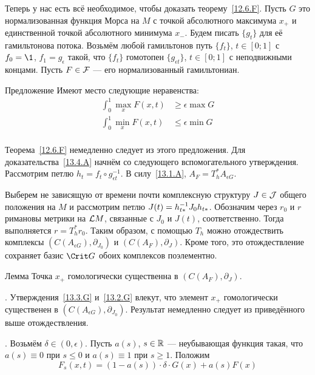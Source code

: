 Теперь у нас есть всё необходимое, чтобы доказать теорему~\ref{12.6.F}.
Пусть $G$ это нормализованная функция Морса на $M$ с
точкой абсолютного максимума $x_{+}$ и единственной точкой абсолютного
минимума $x_{-}$. 
Будем писать $\{g_{t}\}$ для её гамильтонова потока.
Возьмём любой гамильтонов путь $\{f_{t}\}$, $t\in[0;1]$ с $f_{0}=\1$,
$f_{1}=g_{\epsilon}$ такой, что $\{f_{t}\}$ гомотопен $\{g_{\epsilon
t}\}$, $t\in[0;1]$ с неподвижными концами.
Пусть $F\in\mathcal{F}$ --- его нормализованный гамильтониан.
\begin{thm}{Предложение}\label{13.4.A}
  Имеют место следующие неравенства:
  \begin{align*}
    \int_{0}^{1}\max_{x}F(x,t) &\ge \epsilon\max G\\
    \int_{0}^{1}\min_{x}F(x,t) &\le \epsilon\min G\\
  \end{align*}
\end{thm}
Теорема~\ref{12.6.F} немедленно следует из этого предложения.
Для доказательства~\ref{13.4.A} начнём со следующего вспомогательного утверждения.
Рассмотрим петлю $h_{t} = f_{t} \circ g_{\epsilon t}^{-1}$.
В силу~\ref{13.1.A}, $A_{F} = T_{h}^{*}A_{\epsilon G}$.

Выберем не зависящую от времени почти комплексную структуру
$J\in\mathcal{J}$ общего положения на $M$ и рассмотрим петлю $J(t) \z= h_{t*}^{-1}
J_{0}h_{t*}$. 
Обозначим через $r_{0}$ и $r$ римановы метрики на $\mathcal{L} M$, связанные с $J_{0}$ и $J(t)$, соответственно. 
Тогда выполняется $r = T_{h}^{*}r_{0}$.
Таким образом, с помощью $T_{h}$ можно отождествить комплексы
$(C(A_{\epsilon G}), \partial_{J_{0}})$ и $(C(A_{F}), \partial_{J})$.
Кроме того, это отождествление сохраняет базис $\Crit G$ обоих
комплексов поэлементно.

\begin{thm}{Лемма}\label{13.4.B}
  Точка $x_{+}$ гомологически существенна в $(C(A_{F}), \partial_{J})$.  
\end{thm}

.
Утверждения~\ref{13.3.G} и~\ref{13.2.G} влекут, что
элемент $x_{+}$ гомологически существенен в $(C(A_{\epsilon G}), \partial_{J_{0}})$. 
Результат немедленно следует из приведённого выше отождествления.
\qeds

.
Возьмём $\delta\in(0,\epsilon)$.
Пусть $a(s)$, $s\in\mathbb{R}$ --- неубывающая функция такая, что
$a(s)\equiv0$ при $s\le0$ и $a(s)\equiv1$ при $s\ge1$.
Положим
\[
F_{s}(x, t) = (1 - a(s))\cdot\delta\cdot G(x) + a(s)F(x)
\]

